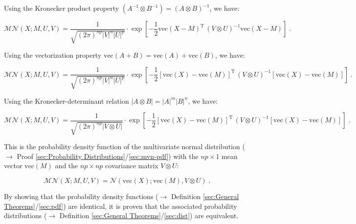 \documentclass[a4paper,12pt,twoside]{book}
\begin{document}
Using the Kronecker product property $\left( A^{-1} \otimes B^{-1} \right) = \left( A \otimes B \right)^{-1}$, we have:

\begin{equation} \label{eq:matn-mvn-matn-mvn-s4}
\mathcal{MN}(X; M, U, V) = \frac{1}{\sqrt{(2\pi)^{np} |V|^n |U|^p}} \cdot \exp\left[-\frac{1}{2} \mathrm{vec}(X-M)^\mathrm{T} \, \left( V \otimes U \right)^{-1} \mathrm{vec}(X-M) \right] \; .
\end{equation}

Using the vectorization property $\mathrm{vec}(A+B) = \mathrm{vec}(A) + \mathrm{vec}(B)$, we have:

\begin{equation} \label{eq:matn-mvn-matn-mvn-s5}
\mathcal{MN}(X; M, U, V) = \frac{1}{\sqrt{(2\pi)^{np} |V|^n |U|^p}} \cdot \exp\left[-\frac{1}{2} \left[ \mathrm{vec}(X) - \mathrm{vec}(M) \right]^\mathrm{T} \, \left( V \otimes U \right)^{-1} \left[ \mathrm{vec}(X) - \mathrm{vec}(M) \right] \right] \; .
\end{equation}

Using the Kronecker-determinant relation $\lvert A \otimes B \rvert = \lvert A \rvert^m \lvert B \rvert^n$, we have:

\begin{equation} \label{eq:matn-mvn-matn-mvn-s6}
\mathcal{MN}(X; M, U, V) = \frac{1}{\sqrt{(2\pi)^{np} |V \otimes U|}} \cdot \exp\left[-\frac{1}{2} \left[ \mathrm{vec}(X) - \mathrm{vec}(M) \right]^\mathrm{T} \, \left( V \otimes U \right)^{-1} \left[ \mathrm{vec}(X) - \mathrm{vec}(M) \right] \right] \; .
\end{equation}

This is the probability density function of the multivariate normal distribution ($\rightarrow$ Proof \ref{sec:Probability Distributions}/\ref{sec:mvn-pdf}) with the $np \times 1$ mean vector $\mathrm{vec}(M)$ and the $np \times np$ covariance matrix $V \otimes U$:

\begin{equation} \label{eq:matn-mvn-matn-mvn}
\mathcal{MN}(X; M, U, V) = \mathcal{N}(\mathrm{vec}(X); \mathrm{vec}(M), V \otimes U) \; .
\end{equation}

By showing that the probability density functions ($\rightarrow$ Definition \ref{sec:General Theorems}/\ref{sec:pdf}) are identical, it is proven that the associated probability distributions ($\rightarrow$ Definition \ref{sec:General Theorems}/\ref{sec:dist}) are equivalent.
\end{document}
